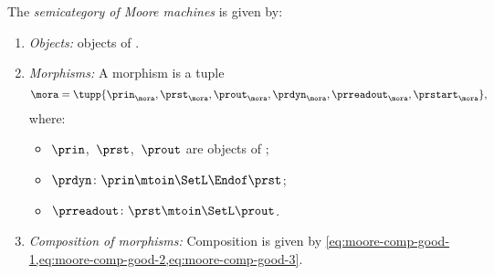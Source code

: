 \begin{definition}[\Moore]
	\label{def:Moore}
	The \emph{semicategory of Moore machines} \Moore is given by:
	\begin{enumerate}
		\item \emph{Objects:} objects of \SetL.
		\item \emph{Morphisms:}
		      A morphism is a tuple
		      \begin{equation}
			      \mora = \tupp{\prin_{\mora},\prst_{\mora},\prout_{\mora},\prdyn_{\mora},\prreadout_{\mora},\prstart_{\mora}},
		      \end{equation}
		      where:
		      \begin{itemize}
			      \item $\prin$,~$\prst$,~$\prout$ are objects of \SetL;
			      \item $ \prdyn \colon \prin \mtoin\SetL  \Endof \prst$;
			      \item $ \prreadout \colon \prst  \mtoin\SetL \prout$.
		      \end{itemize}
		\item \emph{Composition of morphisms:}
		      Composition is given by \cref{eq:moore-comp-good-1,eq:moore-comp-good-2,eq:moore-comp-good-3}.
	\end{enumerate}
\end{definition}

